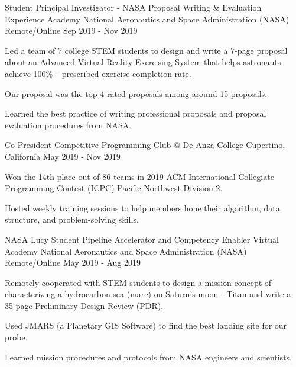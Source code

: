 \begin{cventries}
  \cventry
    {Student Principal Investigator - NASA Proposal Writing \& Evaluation Experience Academy} %
    {National Aeronautics and Space Administration (NASA)} %
    {Remote/Online} %
    {Sep 2019 - Nov 2019} %
    {
	\begin{cvitems} %
      	\item Led a team of 7 college STEM students to design and write a 7-page proposal about an Advanced Virtual Reality Exercising System that helps astronauts achieve 100\%+ prescribed exercise completion rate. 
      	\item Our proposal was the top 4 rated proposals among around 15 proposals.
      	\item Learned the best practice of writing professional proposals and proposal evaluation procedures from NASA.
	\end{cvitems}
    }
    
  \cventry
    {Co-President} %
    {Competitive Programming Club @ De Anza College} %
    {Cupertino, California} %
    {May 2019 - Nov 2019} %
    {
	\begin{cvitems} %
      	\item Won the 14th place out of 86 teams in 2019 ACM International Collegiate Programming Contest (ICPC) Pacific Northwest Division 2. 
      	\item Hosted weekly training sessions to help members hone their algorithm, data structure, and problem-solving skills. 
	\end{cvitems}
    }    
    
    \cventry
    {NASA Lucy Student Pipeline Accelerator and Competency Enabler Virtual Academy} %
    {National Aeronautics and Space Administration (NASA)} %
    {Remote/Online} %
    {May 2019 - Aug 2019} %
    {
	\begin{cvitems} %
      	\item Remotely cooperated with STEM students to design a mission concept of characterizing a hydrocarbon sea (mare) on Saturn’s moon - Titan and write a 35-page Preliminary Design Review (PDR). 
      	\item Used JMARS (a Planetary GIS Software) to find the best landing site for our probe.
      	\item Learned mission procedures and protocols from NASA engineers and scientists. 
	\end{cvitems}
    }  
    

\end{cventries}
